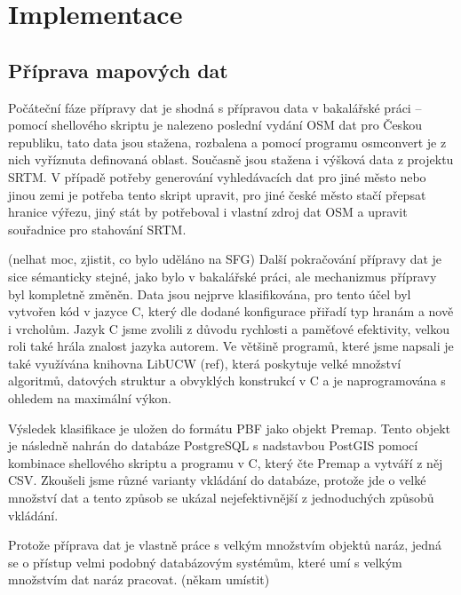 \chapter{Implementace}
\section{Příprava mapových dat}
Počáteční fáze přípravy dat je shodná s přípravou data v bakalářské práci --
pomocí shellového skriptu je nalezeno poslední vydání OSM dat pro Českou
republiku, tato data jsou stažena, rozbalena a pomocí programu osmconvert je z
nich vyříznuta definovaná oblast. Současně jsou stažena i výšková data z
projektu SRTM. V případě potřeby generování vyhledávacích dat pro jiné město
nebo jinou zemi je potřeba tento skript upravit, pro jiné české město stačí
přepsat hranice výřezu, jiný stát by potřeboval i vlastní zdroj dat OSM a
upravit souřadnice pro stahování SRTM. 

(\TODO nelhat moc, zjistit, co bylo uděláno na SFG) Další pokračování přípravy
dat je sice sémanticky stejné, jako bylo v bakalářské práci, ale mechanizmus
přípravy byl kompletně změněn. Data jsou nejprve klasifikována, pro tento účel
byl vytvořen kód v jazyce C, který dle dodané konfigurace přiřadí typ hranám a
nově i vrcholům. Jazyk C jsme zvolili z důvodu rychlosti a paměťové efektivity,
velkou roli také hrála znalost jazyka autorem. Ve většině programů, které jsme
napsali je také využívána knihovna LibUCW (\TODO ref), která poskytuje velké
množství algoritmů, datových struktur a obvyklých konstrukcí v C a je
naprogramována s ohledem na maximální výkon.

Výsledek klasifikace je uložen do formátu PBF jako objekt Premap. Tento objekt
je následně nahrán do databáze PostgreSQL s nadstavbou PostGIS pomocí kombinace
shellového skriptu a programu v C, který čte Premap a vytváří z něj CSV.
Zkoušeli jsme různé varianty vkládání do databáze, protože jde o velké množství
dat a tento způsob se ukázal nejefektivnější z jednoduchých způsobů vkládání. 

Protože příprava dat je vlastně práce s velkým množstvím objektů naráz, jedná se
o přístup velmi podobný databázovým systémům, které umí s velkým množstvím dat
naráz pracovat. (\TODO někam umístit) 


